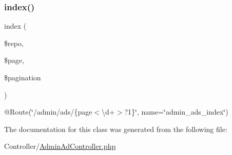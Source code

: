 \subsubsection{\texorpdfstring{index()}{index()}}
{\footnotesize\ttfamily index (\begin{DoxyParamCaption}\item[{\mbox{\hyperlink{class_app_1_1_repository_1_1_ad_repository}{Ad\+Repository}}}]{\$repo,  }\item[{}]{\$page,  }\item[{\mbox{\hyperlink{class_app_1_1_service_1_1_pagination_service}{Pagination\+Service}}}]{\$pagination }\end{DoxyParamCaption})}

@\+Route(\char`\"{}/admin/ads/\{page$<$\textbackslash{}d+$>$?1\}\char`\"{}, name=\char`\"{}admin\+\_\+ads\+\_\+index\char`\"{}) 

The documentation for this class was generated from the following file\+:\begin{DoxyCompactItemize}
\item 
Controller/\mbox{\hyperlink{_admin_ad_controller_8php}{Admin\+Ad\+Controller.\+php}}\end{DoxyCompactItemize}
